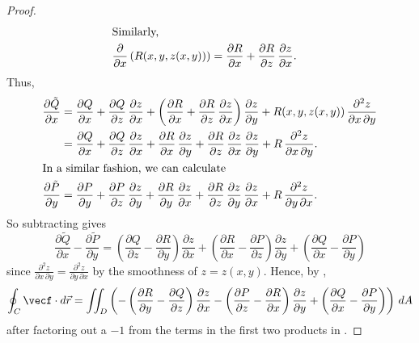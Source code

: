 \begin{proof}
\begin{align*}
  \intertext{Similarly,}
  \frac{\partial}{\partial x} \left( R(x,y,z(x,y)) \right) &=
   \frac{\partial R}{\partial x} + \frac{\partial R}{\partial z}\,\frac{\partial z}{\partial x} .
\end{align*}
 Thus,
 \begin{align*}
  \frac{\partial \tilde{Q}}{\partial x} &= \frac{\partial Q}{\partial x} + \frac{\partial Q}{\partial z}\,
   \frac{\partial z}{\partial x} + \left( \frac{\partial R}{\partial x} + \frac{\partial R}{\partial z}\,
   \frac{\partial z}{\partial x} \right) \frac{\partial z}{\partial y} + R(x,y,z(x,y))\,
   \frac{\partial^2 z}{\partial x \, \partial y}\\
   &= \frac{\partial Q}{\partial x} + \frac{\partial Q}{\partial z}\,\frac{\partial z}{\partial x} +
    \frac{\partial R}{\partial x}\,\frac{\partial z}{\partial y} + \frac{\partial R}{\partial z}\,
    \frac{\partial z}{\partial x}\,\frac{\partial z}{\partial y} + R\,\frac{\partial^2 z}{\partial x \, \partial y}.\\
  \intertext{In a similar fashion, we can calculate}
  \frac{\partial \tilde{P}}{\partial y} &= \frac{\partial P}{\partial y} +
   \frac{\partial P}{\partial z}\,\frac{\partial z}{\partial y} +
    \frac{\partial R}{\partial y}\,\frac{\partial z}{\partial x} + \frac{\partial R}{\partial z}\,
    \frac{\partial z}{\partial y}\,\frac{\partial z}{\partial x} + R\,\frac{\partial^2 z}{\partial y \, \partial x}.
 \end{align*}
 So subtracting gives
 \begin{equation}\label{eqn:stokeslong}
  \frac{\partial \tilde{Q}}{\partial x} - \frac{\partial \tilde{P}}{\partial y} =
   \left( \frac{\partial Q}{\partial z} - \frac{\partial R}{\partial y} \right) \frac{\partial z}{\partial x}
   + \left( \frac{\partial R}{\partial x} - \frac{\partial P}{\partial z}\right) \frac{\partial z}{\partial y}
   + \left( \frac{\partial Q}{\partial x} - \frac{\partial P}{\partial y} \right)
 \end{equation}
 since $\frac{\partial^2 z}{\partial x \, \partial y} = \frac{\partial^2 z}{\partial y \, \partial x}$ by the
 smoothness of $z=z(x,y)$. Hence, by ,
 \begin{equation}\label{eqn:stokespart1}
  \oint_C\vecf\cdot d\vec{r} = \iint_{D} \left(
   -\left( \frac{\partial R}{\partial y} - \frac{\partial Q}{\partial z} \right) \frac{\partial z}{\partial x}
   -\left( \frac{\partial P}{\partial z} - \frac{\partial R}{\partial x} \right) \frac{\partial z}{\partial y}
   + \left( \frac{\partial Q}{\partial x} - \frac{\partial P}{\partial y} \right) \right)\,dA
 \end{equation}
 after factoring out a $-1$ from the terms in the first two products in .
 

\end{proof}
